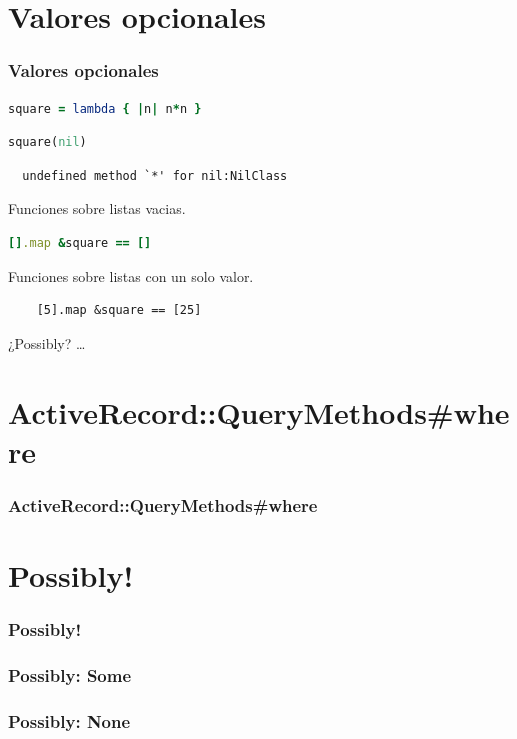\documentclass{beamer}
\begin{document}
\section{Valores opcionales}
\begin{frame}[fragile]
  \frametitle{Valores opcionales}

  \begin{lstlisting}[language=Ruby]
    square = lambda { |n| n*n }
  \end{lstlisting}
  \begin{lstlisting}[language=Ruby]
    square(nil)
  \end{lstlisting}

  \begin{verbatim}
  undefined method `*' for nil:NilClass
  \end{verbatim}

  Funciones sobre listas vacias.
  \begin{lstlisting}[language=Ruby]
    [].map &square == []
  \end{lstlisting}
  Funciones sobre listas con un solo valor.
  \begin{lstlisting}
    [5].map &square == [25]
  \end{lstlisting}
  ¿Possibly? \ldots
\end{frame}

\section{ActiveRecord::QueryMethods\#where}
\begin{frame}[fragile]
  \frametitle{ActiveRecord::QueryMethods\#where}
  
\end{frame}

\section{Possibly!}
\begin{frame}[fragile]
  \frametitle{Possibly!}
  
\end{frame}

\begin{frame}[fragile]
  \frametitle{Possibly: Some}
  
\end{frame}

\begin{frame}[fragile]
  \frametitle{Possibly: None}
  
\end{frame}
\end{document}
